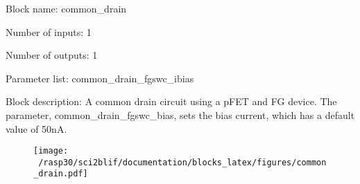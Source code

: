 \pagebreak

Block name: common\_drain

Number of inputs: 1

Number of outputs: 1

Parameter list: common\_drain\_fgswc\_ibias

Block description: 
A common drain circuit using a pFET and FG device. The parameter, common\_drain\_fgswc\_bias, sets the bias current, which has a default value of 50nA.

\begin{figure}[H]  %
\texttt{[image: ~/rasp30/sci2blif/documentation/blocks\_latex/figures/common\_drain.pdf]}
\end{figure}

